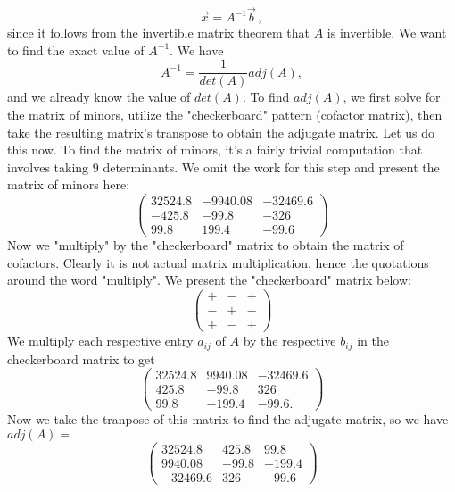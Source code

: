 \documentclass{article}
\begin{document}
\begin{equation*}
    \vec{x} = A^{-1}\vec{b} \, ,
\end{equation*}
since it follows from the invertible matrix theorem that $A$ is invertible.
We want to find the exact value of $A^{-1}$. We have
\begin{equation*}
    A^{-1} = \frac{1}{det(A)}adj(A),
\end{equation*}
and we already know the value of $det(A)$. To find $adj(A)$, we first solve for the matrix of minors, utilize the "checkerboard" pattern (cofactor matrix), then take the resulting matrix's transpose to obtain the adjugate matrix.
Let us do this now. To find the matrix of minors, it's a fairly trivial computation that involves taking $9$ determinants. We omit the work for this step and present the matrix of minors here:
\begin{equation*}
\begin{pmatrix}
    32524.8 & -9940.08 & -32469.6 \\
    -425.8 & -99.8 & -326\\
    99.8 & 199.4 & -99.6
\end{pmatrix}
\end{equation*}
Now we "multiply" by the "checkerboard" matrix to obtain the matrix of cofactors. Clearly it is not actual matrix multiplication, hence the quotations around the word "multiply". We present the "checkerboard" matrix below:
\begin{equation*}
    \begin{pmatrix}
        + & - & + \\
        - & + & -\\
        + & - & +
    \end{pmatrix}
\end{equation*}
We multiply each respective entry $a_{ij}$ of $A$ by the respective $b_{ij}$ in the checkerboard matrix to get
\begin{equation*}
    \begin{pmatrix}
    32524.8 & 9940.08 & -32469.6 \\
    425.8 & -99.8 & 326\\
    99.8 & -199.4 & -99.6.
    \end{pmatrix}
\end{equation*}
Now we take the tranpose of this matrix to find the adjugate matrix, so we have $adj(A) =$
\[
\begin{pmatrix}
    32524.8 & 425.8 & 99.8 \\
    9940.08 & -99.8 & -199.4\\
    -32469.6 & 326 & -99.6
\end{pmatrix}
\]
\end{document}
